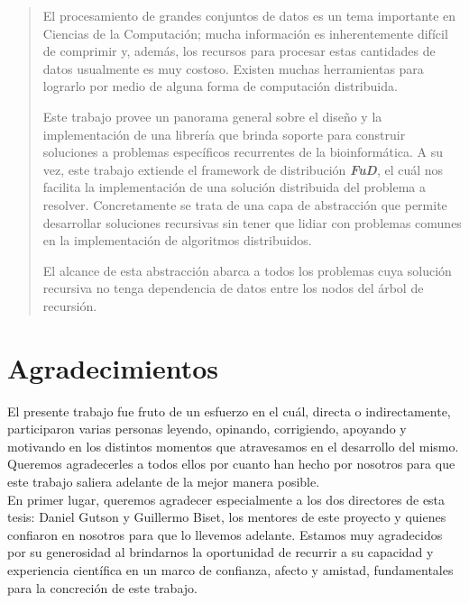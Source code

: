 \documentclass[a4paper,12pt]{report}
\def\fud {\textbf{\textit{FuD}}}
\begin{document}
    \begin{abstract}

        El procesamiento de grandes conjuntos de datos es un tema importante en Ciencias de la Computación; mucha información es
        inherentemente difícil de comprimir y, además, los recursos para procesar estas cantidades de datos usualmente es muy costoso.
        Existen muchas herramientas para lograrlo por medio de alguna forma de computación distribuida.
        
        Este trabajo provee un panorama general sobre el diseño y la implementación de una librería que brinda soporte para construir
        soluciones a problemas específicos recurrentes de la bioinformática. A su vez, este trabajo extiende el framework de distribución
        \fud{}, el cuál nos facilita la implementación de una solución distribuida del problema a resolver. Concretamente se trata de una
        capa de abstracción que permite desarrollar soluciones recursivas sin tener que lidiar con problemas comunes en la implementación
        de algoritmos distribuidos.

        El alcance de esta abstracción abarca a todos los problemas cuya solución recursiva no tenga dependencia de datos entre los nodos
        del árbol de recursión.

    \end{abstract}

    \newpage
\chapter*{Agradecimientos}

El presente trabajo fue fruto de un esfuerzo en el cuál, directa o indirectamente, participaron varias personas leyendo, opinando,
corrigiendo, apoyando y motivando en los distintos momentos que atravesamos en el desarrollo del mismo. Queremos agradecerles a todos ellos
por cuanto han hecho por nosotros para que este trabajo saliera adelante de la mejor manera posible.\\

En primer lugar, queremos agradecer especialmente a los dos directores de esta tesis: Daniel Gutson y Guillermo Biset, los mentores de este
proyecto y quienes confiaron en nosotros para que lo llevemos adelante. Estamos muy agradecidos por su generosidad al brindarnos la
oportunidad de recurrir a su capacidad y experiencia científica en un marco de confianza, afecto y amistad, fundamentales para la concreción
de este trabajo.\\
\end{document}
